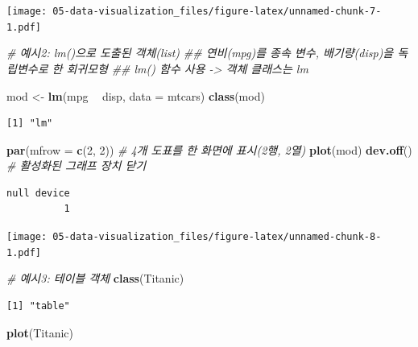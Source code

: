 \documentclass[
  11pt,
]{krantz}
\newenvironment{Shaded}{\begin{snugshade}}{\end{snugshade}}
\newcommand{\CommentTok}[1]{\textcolor[rgb]{0.37,0.37,0.37}{\textit{#1}}}
\newcommand{\DataTypeTok}[1]{\textcolor[rgb]{0.27,0.27,0.27}{#1}}
\newcommand{\DecValTok}[1]{\textcolor[rgb]{0.06,0.06,0.06}{#1}}
\newcommand{\KeywordTok}[1]{\textcolor[rgb]{0.27,0.27,0.27}{\textbf{#1}}}
\newcommand{\NormalTok}[1]{#1}
\newcommand{\OperatorTok}[1]{\textcolor[rgb]{0.43,0.43,0.43}{\textbf{#1}}}
\newcommand{\StringTok}[1]{\textcolor[rgb]{0.5,0.5,0.5}{#1}}
\begin{document}
\texttt{[image: 05-data-visualization\_files/figure-latex/unnamed-chunk-7-1.pdf]}

\normalsize

\footnotesize

\begin{Shaded}
\begin{Highlighting}[]
\CommentTok{# 예시2: lm()으로 도출된 객체(list)}
\CommentTok{## 연비(mpg)를 종속 변수, 배기량(disp)을 독립변수로 한 회귀모형}
\CommentTok{## lm() 함수 사용 -> 객체 클래스는 lm}

\NormalTok{mod <-}\StringTok{ }\KeywordTok{lm}\NormalTok{(mpg }\OperatorTok{~}\StringTok{ }\NormalTok{disp, }\DataTypeTok{data =}\NormalTok{ mtcars)}
\KeywordTok{class}\NormalTok{(mod)}
\end{Highlighting}
\end{Shaded}

\begin{verbatim}
[1] "lm"
\end{verbatim}

\begin{Shaded}
\begin{Highlighting}[]
\KeywordTok{par}\NormalTok{(}\DataTypeTok{mfrow =} \KeywordTok{c}\NormalTok{(}\DecValTok{2}\NormalTok{, }\DecValTok{2}\NormalTok{)) }\CommentTok{# 4개 도표를 한 화면에 표시(2행, 2열)}
\KeywordTok{plot}\NormalTok{(mod)}
\KeywordTok{dev.off}\NormalTok{() }\CommentTok{# 활성화된 그래프 장치 닫기}
\end{Highlighting}
\end{Shaded}

\begin{verbatim}
null device 
          1 
\end{verbatim}

\texttt{[image: 05-data-visualization\_files/figure-latex/unnamed-chunk-8-1.pdf]}

\normalsize

\footnotesize

\begin{Shaded}
\begin{Highlighting}[]
\CommentTok{# 예시3: 테이블 객체}
\KeywordTok{class}\NormalTok{(Titanic)}
\end{Highlighting}
\end{Shaded}

\begin{verbatim}
[1] "table"
\end{verbatim}

\begin{Shaded}
\begin{Highlighting}[]
\KeywordTok{plot}\NormalTok{(Titanic)}
\end{Highlighting}
\end{Shaded}
\end{document}
